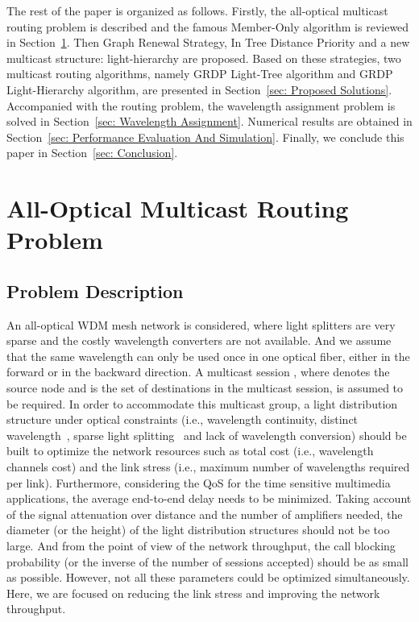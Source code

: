 \documentclass[conference]{IEEEtran}
\begin{document}
The rest of the paper is organized as follows. Firstly, the all-optical multicast routing problem is described and the famous Member-Only algorithm is reviewed in Section~\ref{sec: All-Optical Multicast Routing Problem}. Then Graph Renewal Strategy, In Tree Distance Priority and a new multicast structure: light-hierarchy are proposed. Based on these strategies, two multicast routing algorithms, namely GRDP Light-Tree algorithm and GRDP Light-Hierarchy algorithm, are presented in Section~\ref{sec: Proposed Solutions}. Accompanied with the routing problem, the wavelength assignment problem is solved in Section~\ref{sec: Wavelength Assignment}. Numerical results are obtained in Section~\ref{sec: Performance Evaluation And Simulation}. Finally, we conclude this paper in Section~\ref{sec: Conclusion}.

\section{All-Optical Multicast Routing Problem}
\label{sec: All-Optical Multicast Routing Problem}
\subsection{Problem Description}
\label{subsec: Problem Description}
An all-optical WDM mesh network is considered, where light splitters are very sparse and the costly wavelength converters are not available. And we assume that the same wavelength can only be used once in one optical fiber, either in the forward or in the backward direction. A multicast session , where  denotes the source node and  is the set of destinations in the multicast session, is assumed to be required. In order to accommodate this multicast group, a light distribution structure under optical constraints (i.e., wavelength continuity, distinct wavelength~\cite{bMukherjee2000}, sparse light splitting~\cite{rMalli1998} and lack of wavelength conversion) should be built to optimize the network resources such as total cost (i.e., wavelength channels cost) and the link stress (i.e., maximum number of wavelengths required per link). Furthermore, considering the QoS for the time sensitive multimedia applications, the average end-to-end delay needs to be minimized. Taking account of the signal attenuation over distance and the number of amplifiers needed, the diameter (or the height) of the light distribution structures should not be too large. And from the point of view of the network throughput, the call blocking probability (or the inverse of the number of sessions accepted) should be as small as possible. However, not all these parameters could be optimized simultaneously. Here, we are focused on reducing the link stress and improving the network throughput.
\end{document}

